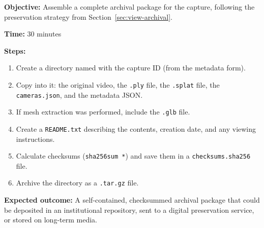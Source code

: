 \begin{tcolorbox}[
  enhanced,
  colback=SuccessGreen!8,
  colframe=SuccessGreen,
  fonttitle=\bfseries\sffamily,
  title={Exercise 3.2: Archival Package},
  sharp corners=south,
  boxrule=0.6pt
]
\textbf{Objective:} Assemble a complete archival package for the capture, following the preservation strategy from Section~\ref{sec:view-archival}.

\textbf{Time:} 30 minutes

\textbf{Steps:}
\begin{enumerate}
  \item Create a directory named with the capture ID (from the metadata form).
  \item Copy into it: the original video, the \texttt{.ply} file, the \texttt{.splat} file, the \texttt{cameras.json}, and the metadata JSON.
  \item If mesh extraction was performed, include the \texttt{.glb} file.
  \item Create a \texttt{README.txt} describing the contents, creation date, and any viewing instructions.
  \item Calculate checksums (\texttt{sha256sum *}) and save them in a \texttt{checksums.sha256} file.
  \item Archive the directory as a \texttt{.tar.gz} file.
\end{enumerate}

\textbf{Expected outcome:} A self-contained, checksummed archival package that could be deposited in an institutional repository, sent to a digital preservation service, or stored on long-term media.
\end{tcolorbox}
